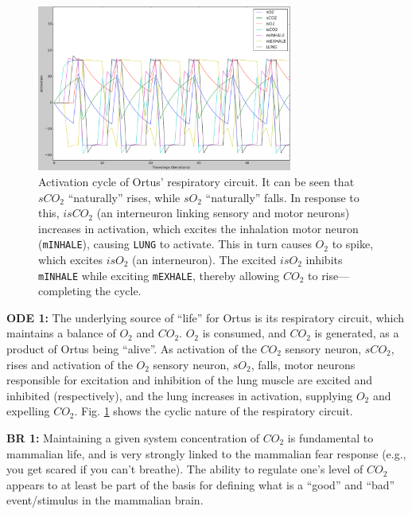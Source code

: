 \documentclass[letterpaper]{article}
\begin{document}
\begin{figure}
\begin{center}
\includegraphics[width=3.3in]{images/respiration.png}
\caption{Activation cycle of Ortus' respiratory circuit. It can be seen that $sCO_2$ ``naturally'' rises, while $sO_2$ ``naturally'' falls. In response to this, $isCO_2$ (an interneuron linking sensory and motor neurons) increases in activation, which excites the inhalation motor neuron (\texttt{mINHALE}), causing \texttt{LUNG} to activate. This in turn causes $O_2$ to spike, which excites $isO_2$ (an interneuron). The excited $isO_2$ inhibits \texttt{mINHALE} while exciting \texttt{mEXHALE}, thereby allowing $CO_2$ to rise---completing the cycle.}
\label{respiration}
\end{center}
\end{figure}


\textbf{ODE 1:} The underlying source of ``life'' for Ortus is its respiratory circuit, which maintains a balance of $O_2$ and $CO_2$. $O_2$ is consumed, and $CO_2$ is generated, as a product of Ortus being ``alive''. As activation of the $CO_2$ sensory neuron, $sCO_2$, rises and activation of the $O_2$ sensory neuron, $sO_2$, falls, motor neurons responsible for excitation and inhibition of the lung muscle are excited and inhibited (respectively), and the lung increases in activation, supplying $O_2$ and expelling $CO_2$. Fig. \ref{respiration} shows the cyclic nature of the respiratory circuit.

\textbf{BR 1:} Maintaining a given system concentration of $CO_2$ is fundamental to mammalian life, and is very strongly linked to the mammalian fear response (e.g., you get scared if you can't breathe). The ability to regulate one's level of $CO_2$ appears to at least be part of the basis for defining what is a ``good'' and ``bad'' event/stimulus in the mammalian brain.
\end{document}
